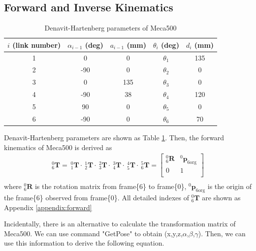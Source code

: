 \subsection{Forward and Inverse Kinematics}
\label{sec:forward}
\begin{table}[htbp]
\centering
\caption{Denavit-Hartenberg parameters of Meca500}
\label{tab:DHtable}
\begin{tabular}{ccccc} 
\hline \hline
$i$ (link number)		&$\alpha _{i-1}$ (deg)	&$a_{i-1}$ (mm)	& $\theta _i$ (deg)			&$d_i$ (mm)	\\
\hline
1   					&0    					&0				&$\theta _1$				&135 \\
2   					&-90   					&0				&$\theta _2$				&0 \\
3  						&0    					&135			&$\theta _3$ 				&0 \\
4   					&-90    				&38				&$\theta _4$ 				&120 \\
5   					&90   					&0				&$\theta _5$ 				&0 \\
6						&-90  					&0				&$\theta _6$ 				&70
\end{tabular}
\end{table}
Denavit-Hartenberg parameters are shown as Table \ref{tab:DHtable}. Then, the forward kinematics of Meca500 is derived as
\begin{equation}
\begin{split}
^0_6\mathbf{T} =
\ ^0_1\mathbf{T} \cdot \ ^1_2\mathbf{T} \cdot \ ^2_3\mathbf{T} \cdot \ ^3_4\mathbf{T} \cdot \ ^4_5\mathbf{T} \cdot \ ^5_6\mathbf{T} =
\begin{bmatrix}
^0_6\mathbf{R}	&^0\boldsymbol{p}_\mathrm{6org}\\
0				&1\\
\end{bmatrix}\\
\end{split}
\end{equation}\label{eq:translation matrix}
where $^0_6\mathbf{R}$ is the rotation matrix from frame\{6\} to frame\{0\}, $^0\boldsymbol{p}_\mathrm{6org}$ is the origin of the frame\{6\} observed from frame\{0\}. All detailed indexes of $^0_6\mathbf{T}$ are shown as Appendix \ref{appendix:forward}
\par
Incidentally, there is an alternative to calculate the transformation matrix of Meca500. We can use command "GetPose" to obtain (x,y,z,$\alpha$,$\beta$,$\gamma$). Then, we can use this information to derive the following equation.
